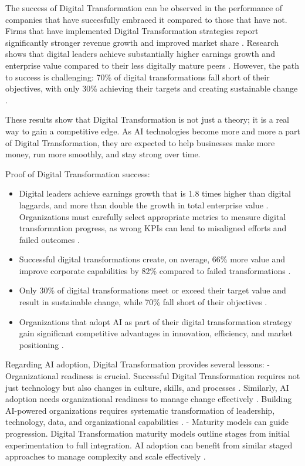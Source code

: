 \documentclass[]{imc-inf}
\begin{document}
The success of Digital Transformation can be observed in the performance
of companies that have succesfully embraced it compared to those that
have not. Firms that have implemented Digital Transformation strategies
report significantly stronger revenue growth and improved market share \citep{DeloitteInsights2023}.
Research shows that digital leaders achieve substantially higher earnings growth
and enterprise value compared to their less digitally mature peers \citep{BCG2020}.
However, the path to success is challenging: 70\% of digital transformations 
fall short of their objectives, with only 30\% achieving their targets and
creating sustainable change \citep{BCG2020}.

These results show that Digital Transformation is not just a theory; it
is a real way to gain a competitive edge. As AI technologies become more
and more a part of Digital Transformation, they are expected to help
businesses make more money, run more smoothly, and stay strong over
time.

Proof of Digital Transformation success:

\begin{itemize}
	\item Digital leaders achieve earnings growth that is 
	1.8 times higher than digital laggards, and more than double the growth in 
	total enterprise value \citep{BCG2020}. Organizations must carefully select appropriate 
	metrics to measure digital transformation progress, as wrong KPIs can lead to 
	misaligned efforts and failed outcomes \citep{Ahmad2021, Schrage2022}.
	
	\item Successful digital transformations create, on average, 66\% more value 
	and improve corporate capabilities by 82\% compared to failed transformations
	\citep{BCG2020}.
	
	\item Only 30\% of digital transformations meet or exceed their target value 
	and result in sustainable change, while 70\% fall short of their objectives
	\citep{BCG2020}.
	
	\item Organizations that adopt AI as part of their digital transformation 
	strategy gain significant competitive advantages in innovation, efficiency, 
	and market positioning \citep{McKinsey2024a}.
\end{itemize}


Regarding AI adoption, Digital Transformation provides several lessons:
- Organizational readiness is crucial. Successful Digital Transformation
requires not just technology but also changes in culture, skills, and
processes \citep{Jöhnk2021}. Similarly, AI adoption needs organizational readiness to
manage change effectively \citep{Hradecky2022, Holmstrom2022}. Building AI-powered organizations requires systematic transformation of leadership, technology, data, and organizational capabilities \citep{Fountaine2019}. - Maturity models can guide progression.
Digital Transformation maturity models outline stages from initial
experimentation to full integration. AI adoption can benefit from
similar staged approaches to manage complexity and scale effectively \citep{Enholm2022}.
\end{document}
